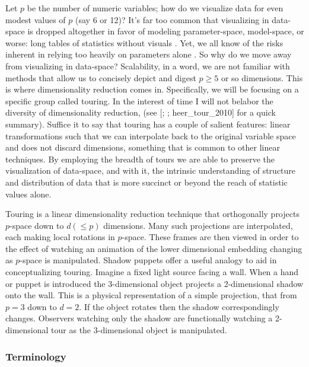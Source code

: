\documentclass{monashthesis}
\begin{document}
Let \(p\) be the number of numeric variables; how do we visualize data for even modest values of \(p\) (say 6 or 12)? It's far too common that visualizing in data-space is dropped altogether in favor of modeling parameter-space, model-space, or worse: long tables of statistics without visuals \autocite{wickham_visualizing_2015}. Yet, we all know of the risks inherent in relying too heavily on parameters alone \autocites{anscombe_graphs_1973}{matejka_same_2017}. So why do we move away from visualizing in data-space? Scalability, in a word, we are not familiar with methods that allow us to concisely depict and digest \(p \geq 5\) or so dimensions. This is where dimensionality reduction comes in. Specifically, we will be focusing on a specific group called touring. In the interest of time I will not belabor the diversity of dimensionality reduction, (see {[}\textcite{grinstein_high-dimensional_2002}; \textcite{carreira-perpinan_review_1997}; heer\_tour\_2010{]} for a quick summary). Suffice it to say that touring has a couple of salient features: linear transformations such that we can interpolate back to the original variable space and does not discard dimensions, something that is common to other linear techniques. By employing the breadth of tours we are able to preserve the visualization of data-space, and with it, the intrinsic understanding of structure and distribution of data that is more succinct or beyond the reach of statistic values alone.

Touring is a linear dimensionality reduction technique that orthogonally projects \(p\)-space down to \(d(\leq p)\) dimensions. Many such projections are interpolated, each making local rotations in \(p\)-space. These frames are then viewed in order to the effect of watching an animation of the lower dimensional embedding changing as \(p\)-space is manipulated. Shadow puppets offer a useful analogy to aid in conceptualizing touring. Imagine a fixed light source facing a wall. When a hand or puppet is introduced the 3-dimensional object projects a 2-dimensional shadow onto the wall. This is a physical representation of a simple projection, that from \(p=3\) down to \(d=2\). If the object rotates then the shadow correspondingly changes. Observers watching only the shadow are functionally watching a 2-dimensional tour as the 3-dimensional object is manipulated.

\hypertarget{terminology}{%
\subsubsection{Terminology}\label{terminology}}
\end{document}
